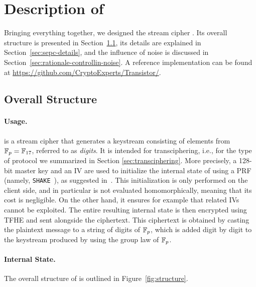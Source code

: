 \section{Description of \coolName}
\label{sec:description}


Bringing everything together, we designed the stream cipher \coolName{}.
Its overall structure is presented in Section~\ref{sec:description-structure}, its details are explained in Section~\ref{sec:sepc-details}, and the influence of noise is discussed in Section~\ref{sec:rationale-controllin-noise}. A reference implementation can be found at \url{https://github.com/CryptoExperts/Transistor/}.

\subsection{Overall Structure}
\label{sec:description-structure}


\paragraph{Usage.}
\label{sec:usage}

\coolName{} is a stream cipher that generates a keystream consisting of elements from \( \mathbb{F}_{p} = \mathbb{F}_{17} \), referred to as {\em digits}.  It is intended for transciphering, i.e., for the type of protocol we summarized in Section \ref{sec:transciphering}.
More precisely, a 128-bit master key and an IV are used to initialize the internal state of \coolName{} using  a PRF (namely, {\tt SHAKE}~\cite{add:SHA3}), as suggested in~\cite{FSE:BerGil07}. This initialization  is only performed on the client side, and in particular is not evaluated homomorphically, meaning that its cost is negligible. On the other hand, it ensures for example that related IVs cannot be exploited. The entire resulting internal state is then encrypted using TFHE and sent alongside the ciphertext. This ciphertext is obtained by casting the plaintext message to a string of digits of $\mathbb{F}_{p}$, which is added digit by digit to the keystream produced by \coolName{} using the group law of $\mathbb{F}_{p}$.



\paragraph{Internal State.}
The overall structure of \coolName{} is outlined in Figure~\ref{fig:structure}.

